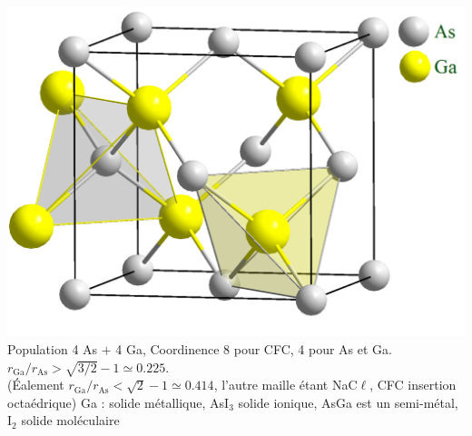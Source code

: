 \begin{solution}
\begin{questions}
    \question ~\\[0em] \includegraphics[width=0.45\linewidth]{chimie/cristallo/AsGa.png}
    \question Population 4 As $+$ 4 Ga, Coordinence 8 pour CFC, 4 pour As et Ga.
    \question $r_\text{Ga}/r_\text{As} > \sqrt{3/2} - 1 \simeq 0.225$.\\
    (\'Ealement $r_\text{Ga}/r_\text{As} < \sqrt{2}-1 \simeq 0.414$, l'autre maille étant NaC$\ell$, CFC insertion octaédrique)
    \question Ga : solide métallique, AsI$_3$ solide ionique, AsGa est un semi-métal, I$_2$ solide moléculaire
\end{questions}
\end{solution}